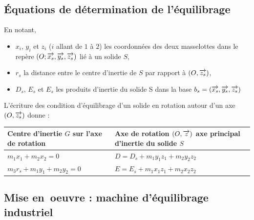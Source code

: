 \documentclass[10pt,fleqn]{article} %
\begin{document}
\subsection{Équations de détermination de l'équilibrage}

\begin{definition}

En notant,
\begin{itemize}
\item $x_i$, $y_i$ et $z_i$ ($i$ allant de $1$ à $2$) les coordonnées des deux masselottes dans le repère $\left(O;\overrightarrow{x_s},\overrightarrow{y_s},\overrightarrow{z_s} \right)$ lié à un solide $S$,
\item $r_s$ la distance entre le centre d'inertie de $S$ par rapport à $\left(O,\overrightarrow{{z}_s}\right)$, 
\item $D_s$, $E_s$ et $E_s$ les produits d'inertie du solide S dans la base $b_s=\left(\overrightarrow{{x}_s},\overrightarrow{{y}_s},\overrightarrow{{z}_s} \right)$
\end{itemize}
L'écriture des condition d'équilibrage d'un solide en rotation autour d'un axe $\left(O,\overrightarrow{{z}_s}\right)$ donne : 

\begin{tabular}{|p{6.5cm}|p{6.5cm}|}
\hline 
\textbf{Centre d'inertie $G$ sur l'axe de rotation} & \textbf{Axe de rotation $\left(O,\overrightarrow{{z}}\right)$ axe principal d'inertie du solide $S$} \\ 
\hline 
$m_1 x_1+m_2 x_2=0$
&
$D=D_s+m_1 y_1 z_1+ m_2 y_2 z_2$
\\ 
$m_3 r_s+m_1 y_1+m_2 y_2=0$
&
$E=E_s+m_1 x_1 z_1+m_2 x_2 z_2$\\
\hline 
\end{tabular} 

\end{definition}

\subsection{Mise en\ oe{}uvre : machine d'équilibrage industriel}
\end{document}

